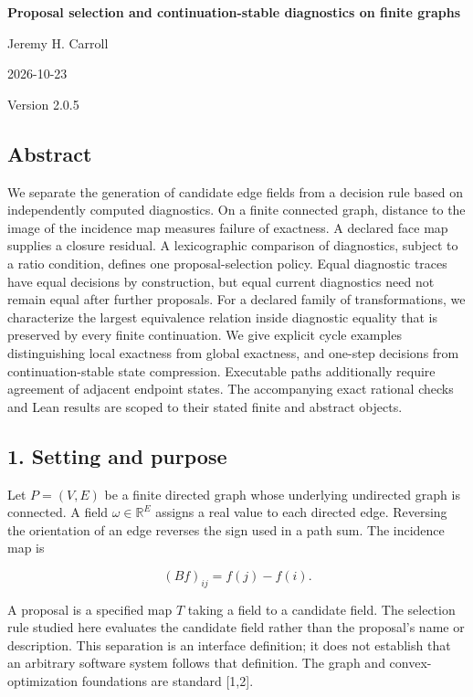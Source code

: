 \documentclass[
]{article}
\author{}
\date{}
\begin{document}
\begin{center}
{\LARGE\bfseries Proposal selection and continuation-stable diagnostics on finite graphs\par}
Jeremy H. Carroll\par
2026-10-23\par
Version 2.0.5\par
\end{center}

\subsection{Abstract}\label{abstract}

We separate the generation of candidate edge fields from a decision rule
based on independently computed diagnostics. On a finite connected
graph, distance to the image of the incidence map measures failure of
exactness. A declared face map supplies a closure residual. A
lexicographic comparison of diagnostics, subject to a ratio condition,
defines one proposal-selection policy. Equal diagnostic traces have
equal decisions by construction, but equal current diagnostics need not
remain equal after further proposals. For a declared family of
transformations, we characterize the largest equivalence relation inside
diagnostic equality that is preserved by every finite continuation. We
give explicit cycle examples distinguishing local exactness from global
exactness, and one-step decisions from continuation-stable state
compression. Executable paths additionally require agreement of adjacent
endpoint states. The accompanying exact rational checks and Lean results
are scoped to their stated finite and abstract objects.

\subsection{1. Setting and purpose}\label{setting-and-purpose}

Let \(P=(V,E)\) be a finite directed graph whose underlying undirected
graph is connected. A field \(\omega\in\mathbb R^E\) assigns a real
value to each directed edge. Reversing the orientation of an edge
reverses the sign used in a path sum. The incidence map is

\[
(Bf)_{ij}=f(j)-f(i).
\]

A proposal is a specified map \(T\) taking a field to a candidate field.
The selection rule studied here evaluates the candidate field rather
than the proposal's name or description. This separation is an interface
definition; it does not establish that an arbitrary software system
follows that definition. The graph and convex-optimization foundations
are standard {[}1,2{]}.
\end{document}
